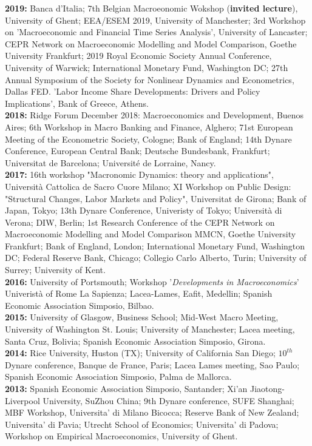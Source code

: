 \documentclass[margin, 11pt]{res} %
\begin{document}
\begin{resume}
\textbf{2019:} {Banca d'Italia; 7th Belgian Macroeonomic Wokshop (\textbf{invited lecture}), University of Ghent; EEA/ESEM 2019, University of Manchester; 3rd Workshop on 'Macroeconomic and Financial Time Series Analysis', University of Lancaster; CEPR Network on Macroeconomic Modelling and Model Comparison, Goethe University Frankfurt; 2019 Royal Economic Society Annual Conference, University of Warwick; International Monetary Fund, Washington DC; 27th Annual Symposium of the Society for Nonlinear Dynamics and Econometrics, Dallas FED. 'Labor Income Share Developments: Drivers and Policy Implications', Bank of Greece, Athens.}
\\
\textbf{2018:} {Ridge Forum December 2018: Macroeconomics and Development, Buenos Aires; 6th Workshop in Macro Banking and Finance, Alghero; 71st European Meeting of the Econometric Society, Cologne; Bank of England; 14th Dynare Conference, European Central Bank; Deutsche Bundesbank, Frankfurt; Universitat de Barcelona; Universit\'{e} de Lorraine, Nancy.} 
\\
\textbf{2017:} {16th workshop "Macronomic Dynamics: theory and applications", Universit\`{a} Cattolica de Sacro Cuore Milano;  XI Workshop on Public Design: "Structural Changes, Labor Markets and Policy", Universitat de Girona; Bank of Japan, Tokyo; 13th Dynare Conference, Univeristy of Tokyo; Universit\`{a} di Verona; DIW, Berlin; 1st Research Conference of the CEPR Network on Macroeconomic Modelling and Model Comparison MMCN, Goethe University Frankfurt; Bank of England, London; International Monetary Fund, Washington DC; Federal Reserve Bank, Chicago; Collegio Carlo Alberto, Turin; University of Surrey; University of Kent.} 
\\
\textbf{2016:} {University of Portsmouth; Workshop '\emph{Developments in Macroeconomics}' Univerist\`{a} of Rome La Sapienza; Lacea-Lames, Eafit, Medellin; Spanish Economic Association Simposio, Bilbao.} 
\\
\textbf{2015:} {University of Glasgow, Business School; Mid-West Macro Meeting, University of Washington St. Louis; University of Manchester; Lacea meeting, Santa Cruz, Bolivia; Spanish Economic Association Simposio, Girona.} 
\\
\textbf{2014:} {Rice University, Huston (TX); University of California San Diego; $10^{th}$ Dynare conference, Banque de France, Paris; Lacea Lames meeting, Sao Paulo; Spanish Economic Association Simposio, Palma de Mallorca.} 
\\
\textbf{2013:} {Spanish Economic Association Simposio, Santander; Xi'an Jiaotong-Liverpool University, SuZhou China; 9th Dynare conference, SUFE Shanghai; MBF Workshop, Universita' di Milano Bicocca; Reserve Bank of New Zealand; Universita' di Pavia; Utrecht School of Economics; Universita' di Padova; Workshop on Empirical Macroeconomics, University of Ghent.}

\end{resume}
\end{document}
